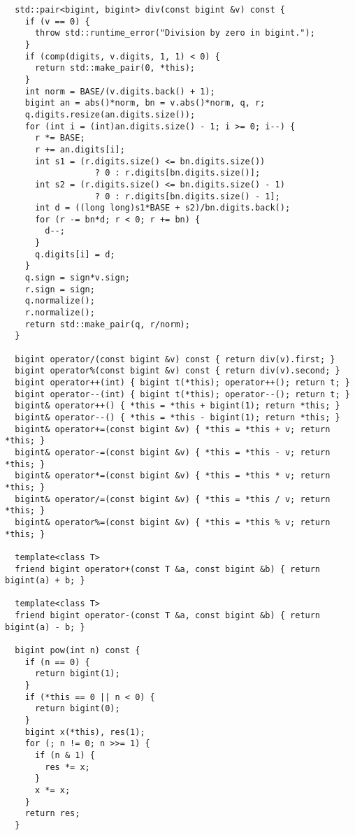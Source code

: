 \begin{lstlisting}
  std::pair<bigint, bigint> div(const bigint &v) const {
    if (v == 0) {
      throw std::runtime_error("Division by zero in bigint.");
    }
    if (comp(digits, v.digits, 1, 1) < 0) {
      return std::make_pair(0, *this);
    }
    int norm = BASE/(v.digits.back() + 1);
    bigint an = abs()*norm, bn = v.abs()*norm, q, r;
    q.digits.resize(an.digits.size());
    for (int i = (int)an.digits.size() - 1; i >= 0; i--) {
      r *= BASE;
      r += an.digits[i];
      int s1 = (r.digits.size() <= bn.digits.size())
                  ? 0 : r.digits[bn.digits.size()];
      int s2 = (r.digits.size() <= bn.digits.size() - 1)
                  ? 0 : r.digits[bn.digits.size() - 1];
      int d = ((long long)s1*BASE + s2)/bn.digits.back();
      for (r -= bn*d; r < 0; r += bn) {
        d--;
      }
      q.digits[i] = d;
    }
    q.sign = sign*v.sign;
    r.sign = sign;
    q.normalize();
    r.normalize();
    return std::make_pair(q, r/norm);
  }

  bigint operator/(const bigint &v) const { return div(v).first; }
  bigint operator%(const bigint &v) const { return div(v).second; }
  bigint operator++(int) { bigint t(*this); operator++(); return t; }
  bigint operator--(int) { bigint t(*this); operator--(); return t; }
  bigint& operator++() { *this = *this + bigint(1); return *this; }
  bigint& operator--() { *this = *this - bigint(1); return *this; }
  bigint& operator+=(const bigint &v) { *this = *this + v; return *this; }
  bigint& operator-=(const bigint &v) { *this = *this - v; return *this; }
  bigint& operator*=(const bigint &v) { *this = *this * v; return *this; }
  bigint& operator/=(const bigint &v) { *this = *this / v; return *this; }
  bigint& operator%=(const bigint &v) { *this = *this % v; return *this; }

  template<class T>
  friend bigint operator+(const T &a, const bigint &b) { return bigint(a) + b; }

  template<class T>
  friend bigint operator-(const T &a, const bigint &b) { return bigint(a) - b; }

  bigint pow(int n) const {
    if (n == 0) {
      return bigint(1);
    }
    if (*this == 0 || n < 0) {
      return bigint(0);
    }
    bigint x(*this), res(1);
    for (; n != 0; n >>= 1) {
      if (n & 1) {
        res *= x;
      }
      x *= x;
    }
    return res;
  }


\end{lstlisting}
